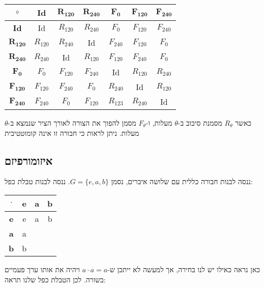 \documentclass{tstextbook}
\begin{document}
\begin{table}[htbp]
  \centering
  \begin{tabular}{|ccccccc|}
    \hline
    \(\circ\) & \textbf{Id} & \(\mathbf{R_{120}}\) & \(\mathbf{R_{240}}\) & \(\mathbf{F_{0}}\) & \(\mathbf{F_{120}}\) & \(\mathbf{F_{240}}\) \\ \hline
    \textbf{Id} & Id & \(R_{120}\) & \(R_{240}\) & \(F_{0}\) & \(F_{120}\) & \(F_{240}\) \\ \hline
    \(\mathbf{R_{120}}\) & \(R_{120}\) & \(R_{240}\) & Id & \(F_{240}\) & \(F_{120}\) & \(F_{0}\) \\ \hline
    \(\mathbf{R_{240}}\) & \(R_{240}\) & Id & \(R_{120}\) & \(F_{120}\) & \(F_{240}\) & \(F_{0}\) \\ \hline
    \(\mathbf{F_{0}}\) & \(F_{0}\) & \(F_{120}\) & \(F_{240}\) & Id & \(R_{120}\) & \(R_{240}\) \\ \hline
    \(\mathbf{F_{120}}\) & \(F_{120}\) & \(F_{240}\) & \(F_{0}\) & \(R_{240}\) & Id & \(R_{120}\) \\ \hline
    \(\mathbf{F_{240}}\) & \(F_{240}\) & \(F_{0}\) & \(F_{120}\) & \(R_{123}\) & \(R_{240}\) & Id \\ \hline
  \end{tabular}
\end{table}
כאשר \(R_{\theta}\) מסמנת סיבוב ב-\(\theta\) מעלות, ו-\(F_{\theta}\) מסמן להפוך את הצורה לאורך הציר שנמצא ב-\(\theta\) מעלות.
ניתן לראות כי חבורה זו אינה קומוטטיבית

\subsection{איזומורפיזם}

ננסה לבנות חבורה כללית עם שלושה איברים, נסמן \(G=\{ e,a,b \}\). ננסה לבנות טבלת כפל:

\begin{table}[htbp]
  \centering
  \begin{tabular}{|cccc|}
    \hline
    \(\cdot\) & e & a & b \\ \hline
    \textbf{e} & e & a & b \\ \hline
    \textbf{a} & a &  &  \\ \hline
    \textbf{b} & b &  &  \\ \hline
  \end{tabular}
\end{table}
כאן נראה כאילו יש לנו בחירה, אך למעשה לא ייתכן ש-\(a\cdot a=a\) ויהיה את אותו ערך פעמיים בשורה. לכן הטבלת כפל שלנו תראה:
\end{document}
